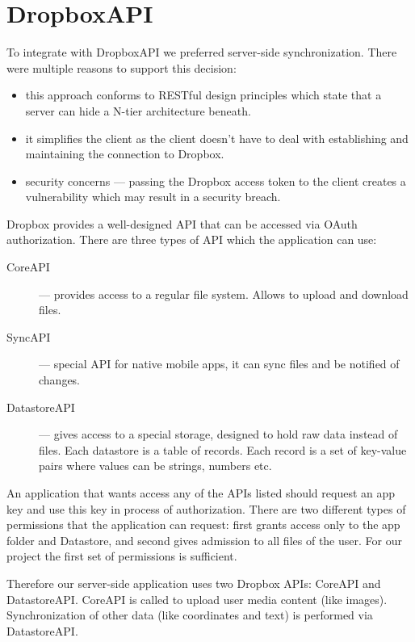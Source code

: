 \documentclass[12pt,a4paper]{article}
\begin{document}
\section{DropboxAPI}

To integrate with DropboxAPI we preferred server-side synchronization.
There were multiple reasons to support this decision:

\begin{itemize}
\item this approach conforms to RESTful design principles which state
  that a server can hide a N-tier architecture beneath.
\item it simplifies the client as the client doesn't have to deal with
  establishing and maintaining the connection to Dropbox.
\item security concerns --- passing the Dropbox access token to the
  client creates a vulnerability which may result in a security breach.
\end{itemize}

Dropbox provides a well-designed API that can be accessed via OAuth
authorization. There are three types of API which the application can
use:

\begin{description}
\item[CoreAPI] --- provides access to a regular file system. Allows to
  upload and download files.

\item[SyncAPI] --- special API for native mobile apps, it can sync files
  and be notified of changes.

\item[DatastoreAPI] --- gives access to a special storage, designed to
  hold raw data instead of files. Each datastore is a table of
  records. Each record is a set of key-value pairs where values can be
  strings, numbers etc.
\end{description}

An application that wants access any of the APIs listed should request
an app key and use this key in process of authorization. There are two
different types of permissions that the application can request: first
grants access only to the app folder and Datastore, and second gives
admission to all files of the user. For our project the first set of
permissions is sufficient.

Therefore our server-side application uses two Dropbox APIs: CoreAPI
and DatastoreAPI\@. CoreAPI is called to upload user media content (like
images). Synchronization of other data (like coordinates and text) is
performed via DatastoreAPI\@.
\end{document}
